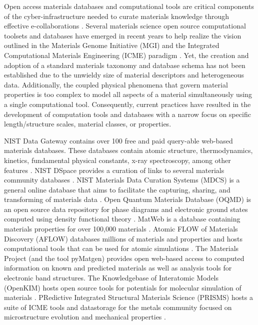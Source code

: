 \documentclass{bmcart}
\begin{document}
Open access materials databases and computational tools are critical components of the cyber-infrastructure needed to curate materials knowledge through effective e-collaborations \cite{bhat2015strategy}. Several materials science open source computational toolsets and databases have emerged in recent years to help realize the vision outlined in the Materials Genome Initiative (MGI) and the Integrated Computational Materials Engineering (ICME) paradigm \cite{ward2012materials, allison2006integrated, MGIwhite, MGI2014, allison2011integrated, olson2000designing, national2008integrated, schmitz2012integrative, robinson2013tms, allisonintegrated, TMSfieldstudy}. Yet, the creation and adoption of a standard materials taxonomy and database schema has not been established due to the unwieldy size of material descriptors and heterogeneous data. Additionally, the coupled physical phenomena that govern material properties is too complex to model all aspects of a material simultaneously using a single computational tool. Consequently, current practices have resulted in the development of computation tools and databases with a narrow focus on specific length/structure scales, material classes, or properties.

NIST Data Gateway contains over 100 free and paid query-able web-based materials databases. These databases contain atomic structure, thermodynamics, kinetics, fundamental physical constants, x-ray spectroscopy, among other features \cite{NISTgateway}. NIST DSpace provides a curation of links to several materials community databases \cite{nist2015dspace}. NIST Materials Data Curation Systems (MDCS) is a general online database that aims to facilitate the capturing, sharing, and transforming of materials data \cite{NISTDCS}. Open Quantum Materials Database (OQMD) is an open source data repository for phase diagrams and electronic ground states computed using density functional theory \cite{saal2013materials}. MatWeb is a database containing materials properties for over 100,000 materials \cite{matweb}.
Atomic FLOW of Materials Discovery (AFLOW) databases millions of materials and properties and hosts computational tools that can be used for atomic simulations \cite{curtarolo2012aflow}. The Materials Project (and the tool pyMatgen) \cite{ong2013python, jain2013commentary} provides open web-based access to computed information on known and predicted materials as well as analysis tools for electronic band structures. The Knowledgebase of Interatomic Models (OpenKIM) hosts open source tools for potentials for molecular simulation of materials \cite{kim2010project}. PRedictive Integrated Structural Materials Science (PRISMS) hosts a suite of ICME tools and datastorage for the metals community focused on microstructure evolution and mechanical properties \cite{prism}.
\end{document}
